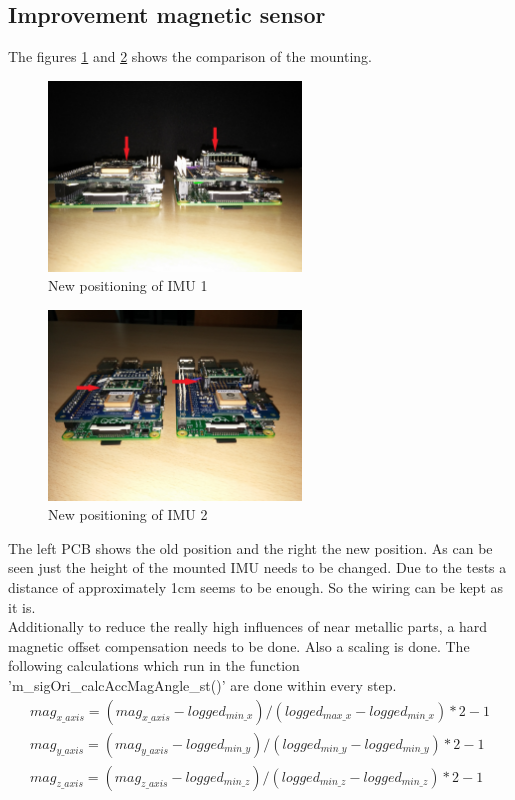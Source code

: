 \subsection{Improvement magnetic sensor}
\label{subsec:ImpMagSens}
The figures \ref{fig:pos_neu1} and \ref{fig:pos_neu2} shows the comparison of the mounting.
\begin{figure}[H]
	\centering\includegraphics[width=0.6\textwidth]{fig/Res_Kal_Comp/pos_neu1}
	\caption{New positioning of IMU 1}
	\label{fig:pos_neu1}
\end{figure}
\begin{figure}[H]
	\centering\includegraphics[width=0.6\textwidth]{fig/Res_Kal_Comp/pos_neu2}
	\caption{New positioning of IMU 2}
	\label{fig:pos_neu2}
\end{figure}
The left PCB shows the old position and the right the new position. As can be seen just the height of the mounted IMU needs to be changed. Due to the tests a distance of approximately 1cm seems to be enough. So the wiring can be kept as it is.\\
Additionally to reduce the really high influences of near metallic parts, a hard magnetic offset compensation needs to be done. Also a scaling is done. The following calculations which run in the function 'm\_sigOri\_calcAccMagAngle\_st()' are done within every step.
\begin{align}
mag_{x\_axis}=(mag_{x\_axis}-logged_{min\_x})/(logged_{max\_x}-logged_{min\_x})*2-1\\
mag_{y\_axis}=(mag_{y\_axis}-logged_{min\_y})/(logged_{min\_y}-logged_{min\_y})*2-1\\
mag_{z\_axis}=(mag_{z\_axis}-logged_{min\_z})/(logged_{min\_z}-logged_{min\_z})*2-1
\end{align}
